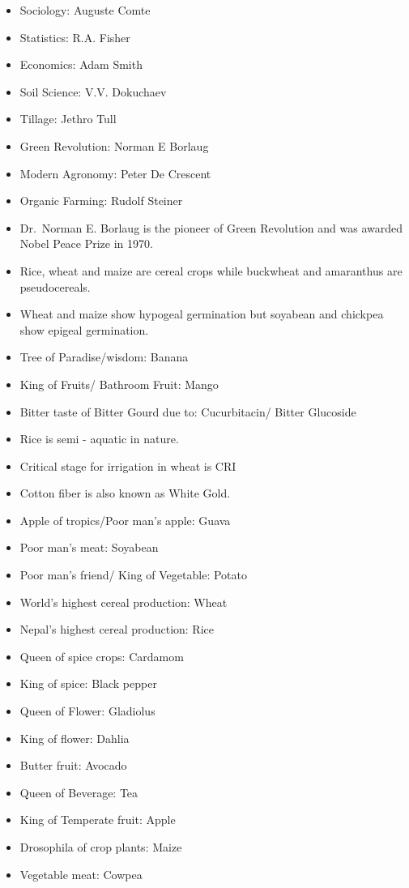 \documentclass[
  openany]{book}
\begin{document}
\begin{itemize}
\item
  Sociology: Auguste Comte
\item
  Statistics: R.A. Fisher
\item
  Economics: Adam Smith
\item
  Soil Science: V.V. Dokuchaev
\item
  Tillage: Jethro Tull
\item
  Green Revolution: Norman E Borlaug
\item
  Modern Agronomy: Peter De Crescent
\item
  Organic Farming: Rudolf Steiner
\item
  Dr.~Norman E. Borlaug is the pioneer of Green Revolution and was awarded Nobel Peace Prize in 1970.
\item
  Rice, wheat and maize are cereal crops while buckwheat and amaranthus are pseudocereals.
\item
  Wheat and maize show hypogeal germination but soyabean and chickpea show epigeal germination.
\item
  Tree of Paradise/wisdom: Banana
\item
  King of Fruits/ Bathroom Fruit: Mango
\item
  Bitter taste of Bitter Gourd due to: Cucurbitacin/ Bitter Glucoside
\item
  Rice is semi - aquatic in nature.
\item
  Critical stage for irrigation in wheat is CRI
\item
  Cotton fiber is also known as White Gold.
\item
  Apple of tropics/Poor man's apple: Guava
\item
  Poor man's meat: Soyabean
\item
  Poor man's friend/ King of Vegetable: Potato
\item
  World's highest cereal production: Wheat
\item
  Nepal's highest cereal production: Rice
\item
  Queen of spice crops: Cardamom
\item
  King of spice: Black pepper
\item
  Queen of Flower: Gladiolus
\item
  King of flower: Dahlia
\item
  Butter fruit: Avocado
\item
  Queen of Beverage: Tea
\item
  King of Temperate fruit: Apple
\item
  Drosophila of crop plants: Maize
\item
  Vegetable meat: Cowpea
\end{itemize}
\end{document}
